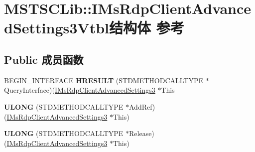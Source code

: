 \hypertarget{struct_m_s_t_s_c_lib_1_1_i_ms_rdp_client_advanced_settings3_vtbl}{}\section{M\+S\+T\+S\+C\+Lib\+:\+:I\+Ms\+Rdp\+Client\+Advanced\+Settings3\+Vtbl结构体 参考}
\label{struct_m_s_t_s_c_lib_1_1_i_ms_rdp_client_advanced_settings3_vtbl}
\subsection*{Public 成员函数}
\begin{DoxyCompactItemize}
\item 
\mbox{\label{struct_m_s_t_s_c_lib_1_1_i_ms_rdp_client_advanced_settings3_vtbl_ab9577ee2304376af65a333d6a3045483}} 
B\+E\+G\+I\+N\+\_\+\+I\+N\+T\+E\+R\+F\+A\+CE {\bfseries H\+R\+E\+S\+U\+LT} (S\+T\+D\+M\+E\+T\+H\+O\+D\+C\+A\+L\+L\+T\+Y\+PE $\ast$Query\+Interface)(\hyperlink{interface_m_s_t_s_c_lib_1_1_i_ms_rdp_client_advanced_settings3}{I\+Ms\+Rdp\+Client\+Advanced\+Settings3} $\ast$This
\item 
\mbox{\label{struct_m_s_t_s_c_lib_1_1_i_ms_rdp_client_advanced_settings3_vtbl_ab084bd13d9aed1ca1b8b3825f5def672}} 
{\bfseries U\+L\+O\+NG} (S\+T\+D\+M\+E\+T\+H\+O\+D\+C\+A\+L\+L\+T\+Y\+PE $\ast$Add\+Ref)(\hyperlink{interface_m_s_t_s_c_lib_1_1_i_ms_rdp_client_advanced_settings3}{I\+Ms\+Rdp\+Client\+Advanced\+Settings3} $\ast$This)
\item 
\mbox{\label{struct_m_s_t_s_c_lib_1_1_i_ms_rdp_client_advanced_settings3_vtbl_afaafa0b0d737b628ec5047a430a473a8}} 
{\bfseries U\+L\+O\+NG} (S\+T\+D\+M\+E\+T\+H\+O\+D\+C\+A\+L\+L\+T\+Y\+PE $\ast$Release)(\hyperlink{interface_m_s_t_s_c_lib_1_1_i_ms_rdp_client_advanced_settings3}{I\+Ms\+Rdp\+Client\+Advanced\+Settings3} $\ast$This)
\item 
\mbox{\label{struct_m_s_t_s_c_lib_1_1_i_ms_rdp_client_advanced_settings3_vtbl_a145fa55af2a7f7dc2b330ba05805799f}} 

\end{DoxyCompactItemize}

